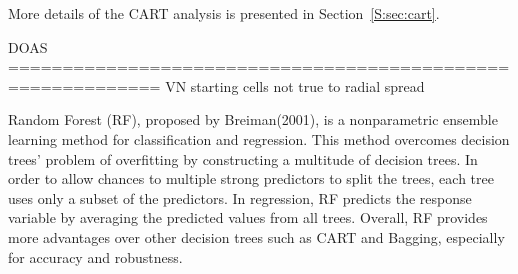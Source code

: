  More details of the
CART analysis is presented in Section~\ref{S:sec:cart}.  

DOAS
============================================================
VN starting cells not true to radial spread


Random Forest (RF), proposed by Breiman(2001), is a nonparametric ensemble learning method for classification and regression. This method overcomes decision trees’ problem of overfitting by constructing a multitude of decision trees. In order to allow chances to multiple strong predictors to split the trees, each tree uses only a subset of the predictors. In regression, RF predicts the response variable by averaging the predicted values from all trees. Overall, RF provides more advantages over other decision trees such as CART and Bagging, especially for accuracy and robustness.

